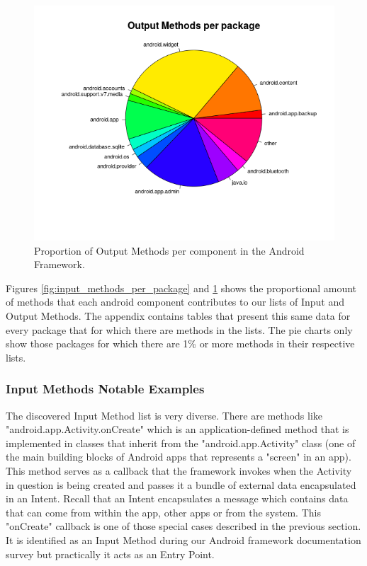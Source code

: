 \documentclass{sig-alternate}
\begin{document}
\begin{figure}
  \centering
  \includegraphics[scale=0.40]{figs/output_methods_per_package.png}
  \caption{Proportion of Output Methods per component in the Android Framework.}
  \label{fig:output_methods_per_package}
\end{figure}

Figures \ref{fig:input_methods_per_package} and \ref{fig:output_methods_per_package} shows the proportional amount of methods that each android component contributes to our lists of Input and Output Methods. The appendix contains tables that present this same data for every package that for which there are methods in the lists. The pie charts only show those packages for which there are 1\% or more methods in their respective lists.

\subsubsection{Input Methods Notable Examples}

The discovered Input Method list is very diverse. There are methods like "android.app.Activity.onCreate" which is an application-defined method that is implemented in classes that inherit from the "android.app.Activity" class (one of the main building blocks of Android apps that represents a "screen" in an app). This method serves as a callback that the framework invokes when the Activity in question is being created and passes it a bundle of external data encapsulated in an Intent. Recall that an Intent encapsulates a message which contains data that can come from within the app, other apps or from the system. This "onCreate" callback is one of those special cases described in the previous section. It is identified as an Input Method during our Android framework documentation survey but practically it acts as an Entry Point.
\end{document}
